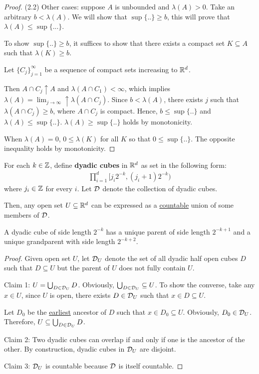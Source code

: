 \documentclass[11pt]{article}
\begin{document}
\begin{theorem}
\begin{proof}
			(2.2) Other cases: suppose $A$ is unbounded and $\lambda(A) > 0$. Take an arbitrary $b < \lambda(A)$. We will show that $\sup\{..\} \geq b$, this will prove that $\lambda(A) \leq \sup\{...\}$.
			
			To show $\sup\{..\} \geq b$, it suffices to show that there exists a compact set $K \subseteq A$ such that $\lambda(K) \geq b$.
			
			Let $\{C_j\}_{j=1}^\infty$ be a sequence of compact sets increasing to $\mathbb{R}^d$.
			
			Then $A \cap C_j \uparrow A$ and $\lambda(A \cap C_1) < \infty$, which implies $\lambda(A) = \lim_{j \to \infty} \uparrow \lambda(A \cap C_j)$. Since $b < \lambda(A)$, there exists $j$ such that $\lambda(A \cap C_j) \geq b$, where $A \cap C_j$ is compact. Hence, $b \leq \sup\{..\}$ and $\lambda(A) \leq \sup\{..\}$.
			$\lambda(A) \geq \sup\{..\}$ holds by monotonicity.
			
			When $\lambda(A) = 0$, $0 \leq \lambda(K)$ for all $K$ so that $0 \leq \sup\{..\}$. The opposite inequality holds by monotonicity.
		\end{proof}
	\end{theorem}


	\begin{lemma}
		For each $k \in \mathbb{Z}$, define \textbf{dyadic cubes} in $\mathbb{R}^d$ as set in the following form:
		\begin{align}
			\prod_{i=1}^d [j_i 2^{-k}, (j_i + 1) 2^{-k})
		\end{align}
		where $j_i \in \mathbb{Z}$ for every $i$. Let $\mathcal{{D}}$ denote the collection of dyadic cubes.

		Then, any open set $U \subseteq \mathbb{R}^d$ can be expressed as a \ul{countable} union of some members of $\mathcal{{D}}$.
		
		A dyadic cube of side length $2^{-k}$ has a unique parent of side length $2^{-k+1}$ and a unique grandparent with side length $2^{-k+2}$.
		
		\begin{proof}
			Given open set $U$, let $\mathcal{{D}}_U$ denote the set of all dyadic half open cubes $D$ such that $D \subseteq U$ but the parent of $U$ does not fully contain $U$.
			
			Claim 1: $U = \bigcup_{D \in \mathcal{{D}}_U} D$. Obviously, $\bigcup_{D \in \mathcal{{D}}_U} \subseteq U$.
			To show the converse, take any $x \in U$, since $U$ is open, there exists $D \in \mathcal{{D}}_U$ such that $x \in D \subseteq U$.
			
			Let $D_0$ be the \ul{earliest} ancestor of $D$ such that $x \in D_0 \subseteq U$. Obviously, $D_0 \in \mathcal{{D}}_U$. Therefore, $U \subseteq \bigcup_{D \in \mathcal{{D}}_U} D$.
			
			Claim 2: Two dyadic cubes can overlap if and only if one is the ancestor of the other. By construction, dyadic cubes in $\mathcal{{D}}_U$ are disjoint.
			
			Claim 3: $\mathcal{{D}}_U$ is countable because $\mathcal{{D}}$ is itself countable.
		\end{proof}
	\end{lemma}
\end{document}
